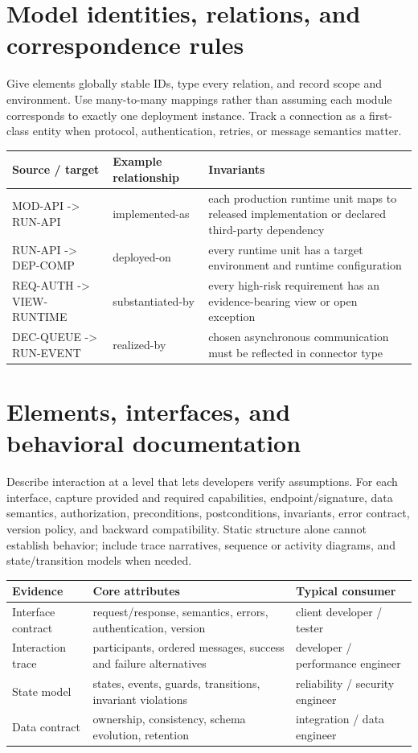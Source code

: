 \documentclass[10pt,letterpaper]{article}
\begin{document}
\section{Model identities, relations, and correspondence rules}
Give elements globally stable IDs, type every relation, and record scope and environment. Use many-to-many mappings rather than assuming each module corresponds to exactly one deployment instance. Track a connection as a first-class entity when protocol, authentication, retries, or message semantics matter.

\small
\begin{tabularx}{\linewidth}{@{}YYY@{}}
\toprule
\textbf{Source / target} & \textbf{Example relationship} & \textbf{Invariants} \\
\midrule
MOD-API -> RUN-API & implemented-as & each production runtime unit maps to released implementation or declared third-party dependency \\
RUN-API -> DEP-COMP & deployed-on & every runtime unit has a target environment and runtime configuration \\
REQ-AUTH -> VIEW-RUNTIME & substantiated-by & every high-risk requirement has an evidence-bearing view or open exception \\
DEC-QUEUE -> RUN-EVENT & realized-by & chosen asynchronous communication must be reflected in connector type \\
\bottomrule
\end{tabularx}
\normalsize
\section{Elements, interfaces, and behavioral documentation}
Describe interaction at a level that lets developers verify assumptions. For each interface, capture provided and required capabilities, endpoint/signature, data semantics, authorization, preconditions, postconditions, invariants, error contract, version policy, and backward compatibility. Static structure alone cannot establish behavior; include trace narratives, sequence or activity diagrams, and state/transition models when needed.

\small
\begin{tabularx}{\linewidth}{@{}YYY@{}}
\toprule
\textbf{Evidence} & \textbf{Core attributes} & \textbf{Typical consumer} \\
\midrule
Interface contract & request/response, semantics, errors, authentication, version & client developer / tester \\
Interaction trace & participants, ordered messages, success and failure alternatives & developer / performance engineer \\
State model & states, events, guards, transitions, invariant violations & reliability / security engineer \\
Data contract & ownership, consistency, schema evolution, retention & integration / data engineer \\
\bottomrule
\end{tabularx}
\normalsize
\end{document}
